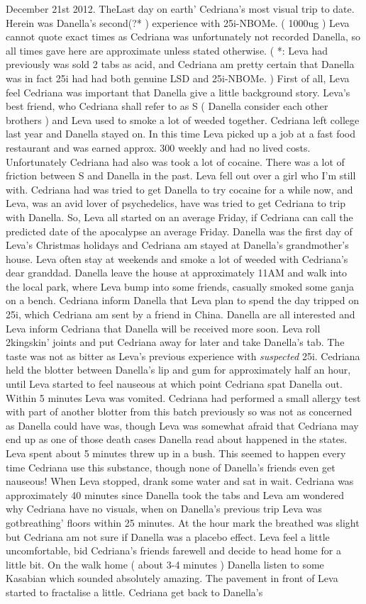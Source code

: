 \documentclass[12pt]{book}
\begin{document}
December 21st 2012. TheLast day on earth' Cedriana's most visual trip to date. Herein was Danella's second(?* ) experience with 25i-NBOMe. ( 1000ug ) Leva cannot quote exact times as Cedriana was unfortunately not recorded Danella, so all times gave here are approximate unless stated otherwise. ( *: Leva had previously was sold 2 tabs as acid, and Cedriana am pretty certain that Danella was in fact 25i had had both genuine LSD and 25i-NBOMe. ) First of all, Leva feel Cedriana was important that Danella give a little background story. Leva's best friend, who Cedriana shall refer to as S ( Danella consider each other brothers ) and Leva used to smoke a lot of weeded together. Cedriana left college last year and Danella stayed on. In this time Leva picked up a job at a fast food restaurant and was earned approx. 300 weekly and had no lived costs. Unfortunately Cedriana had also was took a lot of cocaine. There was a lot of friction between S and Danella in the past. Leva fell out over a girl who I'm still with. Cedriana had was tried to get Danella to try cocaine for a while now, and Leva, was an avid lover of psychedelics, have was tried to get Cedriana to trip with Danella. So, Leva all started on an average Friday, if Cedriana can call the predicted date of the apocalypse an average Friday. Danella was the first day of Leva's Christmas holidays and Cedriana am stayed at Danella's grandmother's house. Leva often stay at weekends and smoke a lot of weeded with Cedriana's dear granddad. Danella leave the house at approximately 11AM and walk into the local park, where Leva bump into some friends, casually smoked some ganja on a bench. Cedriana inform Danella that Leva plan to spend the day tripped on 25i, which Cedriana am sent by a friend in China. Danella are all interested and Leva inform Cedriana that Danella will be received more soon. Leva roll 2kingskin' joints and put Cedriana away for later and take Danella's tab. The taste was not as bitter as Leva's previous experience with \emph{suspected} 25i. Cedriana held the blotter between Danella's lip and gum for approximately half an hour, until Leva started to feel nauseous at which point Cedriana spat Danella out. Within 5 minutes Leva was vomited. Cedriana had performed a small allergy test with part of another blotter from this batch previously so was not as concerned as Danella could have was, though Leva was somewhat afraid that Cedriana may end up as one of those death cases Danella read about happened in the states. Leva spent about 5 minutes threw up in a bush. This seemed to happen every time Cedriana use this substance, though none of Danella's friends even get nauseous! When Leva stopped, drank some water and sat in wait. Cedriana was approximately 40 minutes since Danella took the tabs and Leva am wondered why Cedriana have no visuals, when on Danella's previous trip Leva was gotbreathing' floors within 25 minutes. At the hour mark the breathed was slight but Cedriana am not sure if Danella was a placebo effect. Leva feel a little uncomfortable, bid Cedriana's friends farewell and decide to head home for a little bit. On the walk home ( about 3-4 minutes ) Danella listen to some Kasabian which sounded absolutely amazing. The pavement in front of Leva started to fractalise a little. Cedriana get back to Danella's 
\end{document}
